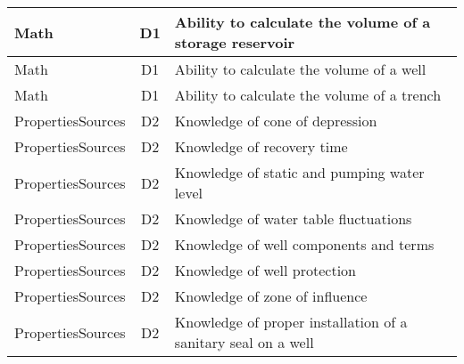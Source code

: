\documentclass{article}
\begin{document}
\begin{table}[]
\begin{tabular}{|l|c|l|}
Math                                   & D1             & Ability to calculate   the volume of a storage reservoir                                                                          \\ \hline
Math                                   & D1             & Ability to calculate   the volume of a well                                                                                       \\ \hline
Math                                   & D1             & Ability to calculate   the volume of a trench                                                                                     \\ \hline
PropertiesSources                      & D2             & Knowledge of cone of   depression                                                                                                 \\ \hline
PropertiesSources                      & D2             & Knowledge of recovery   time                                                                                                      \\ \hline
PropertiesSources                      & D2             & Knowledge of static   and pumping water level                                                                                     \\ \hline
PropertiesSources                      & D2             & Knowledge of water   table fluctuations                                                                                           \\ \hline
PropertiesSources                      & D2             & Knowledge of well   components and terms                                                                                          \\ \hline
PropertiesSources                      & D2             & Knowledge of well   protection                                                                                                    \\ \hline
PropertiesSources                      & D2             & Knowledge of zone of   influence                                                                                                  \\ \hline
PropertiesSources                      & D2             & Knowledge of proper   installation of a sanitary seal on a well                                                                   \\ \hline

\end{tabular}
\end{table}
\end{document}

